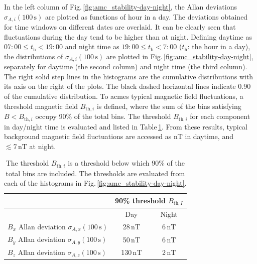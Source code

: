 In the left column of  Fig.\,\ref{fig:amc_stability-day-night}, the Allan deviations $\sigma_{A,i} (100\,\mathrm{s})$ are plotted as functions of hour in a day. The deviations obtained for time windows on different dates are overlaid. It can be clearly seen that fluctuations during the day tend to be higher than at night. Defining daytime as 
$07:00\leq t_{\mathrm{h}}<19:00$ and night time as $19:00\leq t_{\mathrm{h}}<7:00$ ($t_{\mathrm{h}}$: the hour in a day), the distributions of $\sigma_{A,i} (100\,\mathrm{s})$ are plotted in Fig.\,\ref{fig:amc_stability-day-night}, separately for daytime (the second column) and night time (the third column).  The right solid step lines in the histograms are the cumulative distributions with its axis on the right of the plots. The black dashed horizontal lines indicate 0.90 of the cumulative distribution. To acmes typical magnetic field fluctuations,  a threshold magnetic field $B_{\mathrm{th},i}$  is defined, where the sum of the bins satisfying $B<B_{\mathrm{th},i}$ occupy  90\% of the total bins.  The threshold $B_{\mathrm{th},i}$ for each component in day/night time is evaluated and listed in  
Table\,\ref{tab:amc_stability}. From these results, typical background magnetic field  fluctuations are accessed as  $\mathrm{nT}$ in daytime, and $\lesssim 7\,\mathrm{nT}$ at night.

\begin{table}[tb!]
\centering 
\begin{tabular}{|l||c|c|}
\hline
 &\multicolumn{2}{c|}{90\% threshold $B_{\mathrm{th},I}$ }  \\ \hline
 &Day & Night \\ \hline\hline 
$B_{x}$ Allan deviation $\sigma_{A,x}(100\,\mathrm{s})$  & 28\,nT &    6\,nT     \\ \hline
$B_{y}$ Allan deviation $\sigma_{A,y}(100\,\mathrm{s})$ & 50\,nT  & 6\,nT      \\ \hline
$B_{z}$ Allan deviation $\sigma_{A,z}(100\,\mathrm{s})$ &130\,nT  & 2\,nT      \\ \hline
\end{tabular}
\caption{The threshold $B_{\mathrm{th},i}$ is a threshold below which 90\% of the total bins are included. 
The thresholds are evaluated from each of the histograms in Fig.\,\ref{fig:amc_stability-day-night}.}
\label{tab:amc_stability}
\end{table}


